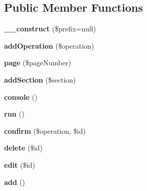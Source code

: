 \subsection*{Public Member Functions}
\begin{DoxyCompactItemize}
\item 
\hypertarget{class_admin_a50722ec747146a7ef24c0a1195f617af}{
{\bfseries \_\-\_\-construct} (\$prefix=null)}
\label{class_admin_a50722ec747146a7ef24c0a1195f617af}

\item 
\hypertarget{class_admin_aef54f42519b356c72ab7959c50a67033}{
{\bfseries addOperation} (\$operation)}
\label{class_admin_aef54f42519b356c72ab7959c50a67033}

\item 
\hypertarget{class_admin_a2e0d6f4b164971660867887c30c85baa}{
{\bfseries page} (\$pageNumber)}
\label{class_admin_a2e0d6f4b164971660867887c30c85baa}

\item 
\hypertarget{class_admin_a9a9e005a97c5f83480eb763ffce2dfc2}{
{\bfseries addSection} (\$section)}
\label{class_admin_a9a9e005a97c5f83480eb763ffce2dfc2}

\item 
\hypertarget{class_admin_ab2508ca6341ac7f54db0b1488bc88f49}{
{\bfseries console} ()}
\label{class_admin_ab2508ca6341ac7f54db0b1488bc88f49}

\item 
\hypertarget{class_admin_a17d4bac660bc1c6c14bbeac21ee10cff}{
{\bfseries run} ()}
\label{class_admin_a17d4bac660bc1c6c14bbeac21ee10cff}

\item 
\hypertarget{class_admin_acc528e391dcb76ec56a30fb846a78633}{
{\bfseries confirm} (\$operation, \$id)}
\label{class_admin_acc528e391dcb76ec56a30fb846a78633}

\item 
\hypertarget{class_admin_af559704017572a72fef6280a651e1245}{
{\bfseries delete} (\$id)}
\label{class_admin_af559704017572a72fef6280a651e1245}

\item 
\hypertarget{class_admin_ae83c8b7e41f3a449474b671c16da11af}{
{\bfseries edit} (\$id)}
\label{class_admin_ae83c8b7e41f3a449474b671c16da11af}

\item 
\hypertarget{class_admin_ac2291a1907111ac636fe23dce06c0290}{
{\bfseries add} ()}
\label{class_admin_ac2291a1907111ac636fe23dce06c0290}

\end{DoxyCompactItemize}
